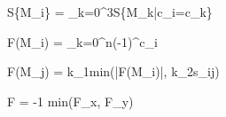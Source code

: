 S\{M_i\} = \sum_{k=0}^{3}{S\{M_k|c_i\not=c_k\}}

F(M_i) = \sum_{k=0}^{n}(-1)^{c_i}

F(M_j) = k_1\cdot min(|F(M_i)|, k_2s_{ij})

F = -1 \cdot min(F_x, F_y) \cdot {}